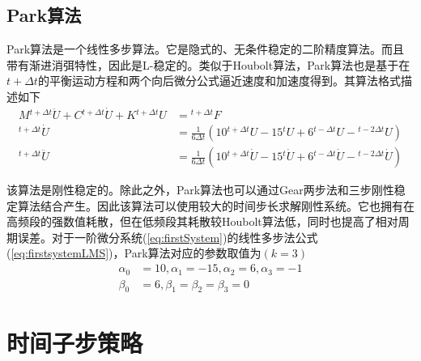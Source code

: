 \subsection{Park算法}
Park算法是一个线性多步算法。它是隐式的、无条件稳定的二阶精度算法。而且带有渐进消弭特性，因此是L-稳定的。类似于Houbolt算法，Park算法也是基于在$t+\Delta t$的平衡运动方程和两个向后微分公式逼近速度和加速度得到。其算法格式描述如下
\begin{subequations}
\begin{align}
M{^{t+\Delta t}\!\ddot{U}}+C{^{t+\Delta t}\!\dot{U}}+K{^{t+\Delta t}\!U}&={^{t+\Delta t}\!F}\\
{^{t+\Delta t}\!\dot{U}}&=\frac{1}{6\Delta t}(10{^{t+\Delta t}\!U}-15{^{t}\!U}+6{^{t-\Delta t}\!U}-{^{t-2\Delta t}\!U})\\
{^{t+\Delta t}\!\ddot{U}}&=\frac{1}{6\Delta t}(10{^{t+\Delta t}\!\dot{U}}-15{^{t}\!\dot{U}}+6{^{t-\Delta t}\!\dot{U}}-{^{t-2\Delta t}\!\dot{U}})
\end{align}
\end{subequations}

该算法是刚性稳定的。除此之外，Park算法也可以通过Gear两步法\cite{Gear1971a}和三步刚性稳定算法\cite{Gear1971a}结合产生。因此该算法可以使用较大的时间步长求解刚性系统。它也拥有在高频段的强数值耗散，但在低频段其耗散较Houbolt算法低，同时也提高了相对周期误差。对于一阶微分系统(\ref{eq:firstSystem})的线性多步法公式(\ref{eq:firstsystemLMS})，Park算法对应的参数取值为$(k=3)$
\begin{equation}
\begin{split}
\alpha_0&=10,\alpha_1=-15,\alpha_2=6,\alpha_3=-1\\
\beta_0&=6,\beta_1=\beta_2=\beta_3=0
\end{split}
\end{equation}









\section{时间子步策略}
